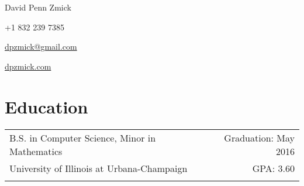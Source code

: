 \documentclass[letterpaper,10pt]{article}
\newcommand{\tbl}{3cm}
\newcommand{\tbr}{12.5cm}
\begin{document}
\begin{center}
    {\Large David Penn Zmick}

    +1 832 239 7385

    \href{mailto:dpzmick@gmail.com}{dpzmick@gmail.com}

    \href{http://dpzmick.com}{dpzmick.com}

\end{center}


\section{Education}
\begin{tabular}{p{12.3cm}r}
    B.S. in Computer Science, Minor in Mathematics & Graduation: May 2016\\
    University of Illinois at Urbana-Champaign     & GPA: 3.60\\
    \\
\end{tabular}




\end{document}
